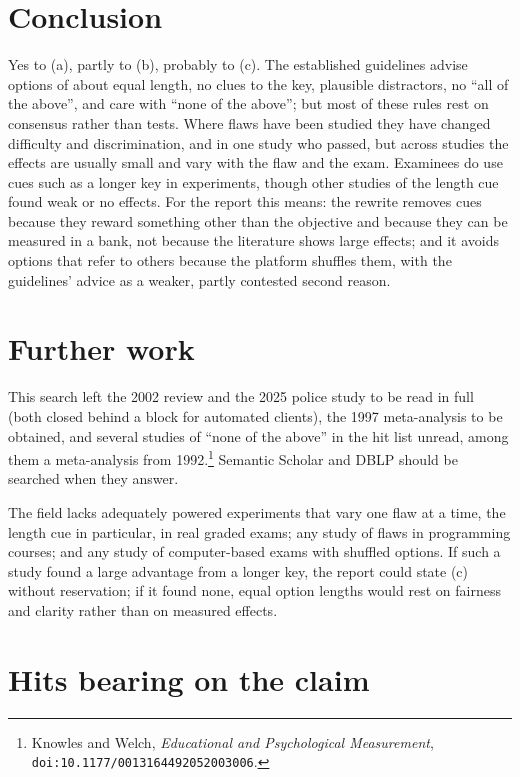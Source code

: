 \section{Conclusion}
\label{sec:item-flaws-conclusion}

Yes to (a), partly to (b), probably to (c).  The established guidelines
advise options of about equal length, no clues to the key, plausible
distractors, no \enquote{all of the above}, and care with \enquote{none of
the above}; but most of these rules rest on consensus rather than tests.
Where flaws have been studied they have changed difficulty and
discrimination, and in one study who passed, but across studies the
effects are usually small and vary with the flaw and the exam.  Examinees
do use cues such as a longer key in experiments, though other studies of
the length cue found weak or no effects.  For the report this means: the
rewrite removes cues because they reward something other than the
objective and because they can be measured in a bank, not because the
literature shows large effects; and it avoids options that refer to
others because the platform shuffles them, with the guidelines' advice
as a weaker, partly contested second reason.

\section{Further work}
\label{sec:item-flaws-further}

This search left the 2002 review and the 2025 police study to be read in
full (both closed behind a block for automated clients), the 1997
meta-analysis to be obtained, and several studies of \enquote{none of the
above} in the hit list unread, among them a meta-analysis from
1992.\footnote{Knowles and Welch, \emph{Educational and Psychological
Measurement}, \texttt{doi:10.1177/0013164492052003006}.}  Semantic Scholar
and DBLP should be searched when they answer.

The field lacks adequately powered experiments that vary one flaw at a
time, the length cue in particular, in real graded exams; any study of
flaws in programming courses; and any study of computer-based exams with
shuffled options.  If such a study found a large advantage from a longer
key, the report could state (c) without reservation; if it found none,
equal option lengths would rest on fairness and clarity rather than on
measured effects.

\section{Hits bearing on the claim}
\label{sec:item-flaws-hits}

